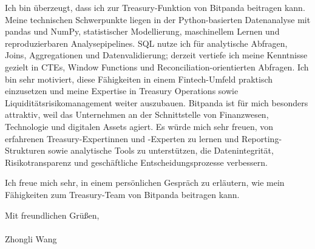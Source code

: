 \documentclass[11pt]{article}
\begin{document}
Ich bin überzeugt, dass ich zur Treasury-Funktion von Bitpanda beitragen kann. Meine technischen Schwerpunkte liegen in der Python-basierten Datenanalyse mit pandas und NumPy, statistischer Modellierung, maschinellem Lernen und reproduzierbaren Analysepipelines. SQL nutze ich für analytische Abfragen, Joins, Aggregationen und Datenvalidierung; derzeit vertiefe ich meine Kenntnisse gezielt in CTEs, Window Functions und Reconciliation-orientierten Abfragen. Ich bin sehr motiviert, diese Fähigkeiten in einem Fintech-Umfeld praktisch einzusetzen und meine Expertise in Treasury Operations sowie Liquiditätsrisikomanagement weiter auszubauen.
Bitpanda ist für mich besonders attraktiv, weil das Unternehmen an der Schnittstelle von Finanzwesen, Technologie und digitalen Assets agiert. Es würde mich sehr freuen, von erfahrenen Treasury-Expertinnen und -Experten zu lernen und Reporting-Strukturen sowie analytische Tools zu unterstützen, die Datenintegrität, Risikotransparenz und geschäftliche Entscheidungsprozesse verbessern.

Ich freue mich sehr, in einem persönlichen Gespräch zu erläutern, wie mein Fähigkeiten zum Treasury-Team von Bitpanda beitragen kann.

\vspace{0.15cm}

\noindent Mit freundlichen Grü\ss{}en, \\
\vspace{2mm}\\
\noindent Zhongli Wang
\end{document}
